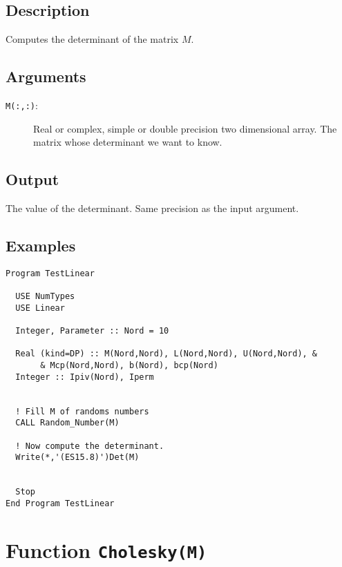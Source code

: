 \subsection{Description}

Computes the determinant of the matrix $M$.

\subsection{Arguments}

\begin{description}
\item[\texttt{M(:,:)}: ] Real or complex, simple or double precision
  two dimensional array. The matrix whose determinant we want to know.
\end{description}

\subsection{Output}

The value of the determinant. Same precision as the input argument.

\subsection{Examples}

\begin{lstlisting}[emph=Det,
                   emphstyle=\color{blue},
                   frame=trBL,
                   caption=Computing the determinant of a matrix.,
                   label=det]
Program TestLinear

  USE NumTypes
  USE Linear

  Integer, Parameter :: Nord = 10

  Real (kind=DP) :: M(Nord,Nord), L(Nord,Nord), U(Nord,Nord), &
       & Mcp(Nord,Nord), b(Nord), bcp(Nord)
  Integer :: Ipiv(Nord), Iperm


  ! Fill M of randoms numbers
  CALL Random_Number(M)

  ! Now compute the determinant.
  Write(*,'(ES15.8)')Det(M)


  Stop
End Program TestLinear
\end{lstlisting}


\section{Function \texttt{Cholesky(M)}}

